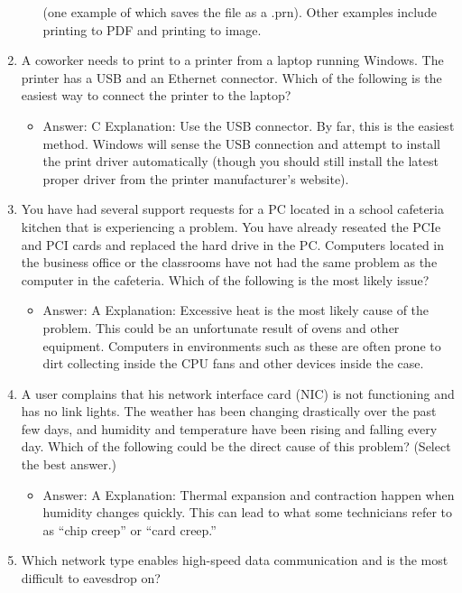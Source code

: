 \documentclass{article}
\begin{document}
\begin{enumerate}
\begin{itemize}
(one example of which saves the file as a .prn). Other examples include printing to PDF
and printing to image.
    \end{itemize}
    \item A coworker needs to print to a printer from a laptop running
Windows. The printer has a USB and an Ethernet connector. Which
of the following is the easiest way to connect the printer to the
laptop?
    \begin{itemize}
        \item Answer: C
Explanation: Use the USB connector. By far, this is the easiest method. Windows will
sense the USB connection and attempt to install the print driver automatically (though
you should still install the latest proper driver from the printer manufacturer’s website).
    \end{itemize}
    \item You have had several support requests for a PC located in a school
cafeteria kitchen that is experiencing a problem. You have already
reseated the PCIe and PCI cards and replaced the hard drive in the
PC. Computers located in the business office or the classrooms
have not had the same problem as the computer in the cafeteria.
Which of the following is the most likely issue?
    \begin{itemize}
        \item Answer: A
Explanation: Excessive heat is the most likely cause of the problem. This could be an
unfortunate result of ovens and other equipment. Computers in environments such as
these are often prone to dirt collecting inside the CPU fans and other devices inside the
case.
    \end{itemize}
    \item A user complains that his network interface card (NIC) is not
functioning and has no link lights. The weather has been changing
drastically over the past few days, and humidity and temperature
have been rising and falling every day. Which of the following
could be the direct cause of this problem? (Select the best
answer.)
    \begin{itemize}
        \item Answer: A
Explanation: Thermal expansion and contraction happen when humidity changes
quickly. This can lead to what some technicians refer to as “chip creep” or “card
creep.”
    \end{itemize}
    \item Which network type enables high-speed data communication and
is the most difficult to eavesdrop on?

\end{enumerate}
\end{document}
